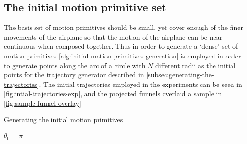 \subsection{The initial motion primitive set}
\label{subsec:initial-motion-primitive}

The basis set of motion primitives should be small, yet cover enough of the
finer movements of the airplane so that the motion of the airplane can be near
continuous when composed together. Thus in order to generate a `dense' set of
motion primitives \cref{alg:initial-motion-primitives-generation} is employed in
order to generate points along the arc of a circle with \(N\) different radii as
the initial points for the trajectory generator described in
\cref{subsec:generating-the-trajectories}. The initial trajectories employed in
the experiments can be seen in \cref{fig:intial-trajectories-exp}, and the
projected funnels overlaid a sample in \cref{fig:sample-funnel-overlay}.

\begin{algorithm}
  \caption{Generating the initial motion primitives}
  \label{alg:initial-motion-primitives-generation}
  \DontPrintSemicolon \SetAlgoNoLine

   

  \(\theta_{0} = \pi\) \;

  \;
\end{algorithm}

